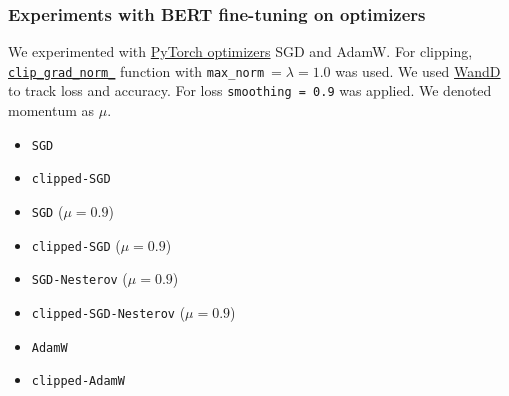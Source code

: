 \begin{frame}
\frametitle{Experiments with BERT fine-tuning on optimizers}
We experimented with \href{https://pytorch.org/docs/stable/optim.html}{\color{blue}PyTorch optimizers} SGD and AdamW. For clipping, \href{https://github.com/pytorch/pytorch/blob/0597eb56c29b3986aa412161b1d3e82b6b36e8d5/torch/nn/utils/clip_grad.py#L12}{\color{blue}\texttt{clip\_grad\_norm\_}} function with \texttt{max\_norm}\(\ =\lambda=1.0\) was used. We used \href{https://wandb.ai/makharev/iu-omml}{\color{blue}WandD} to track loss and accuracy. For loss \texttt{smoothing = 0.9} was applied. We denoted momentum as \(\mu\). 
\begin{itemize}
    \item \texttt{SGD}
    \item \texttt{clipped-SGD}
    \item \texttt{SGD} (\(\mu=0.9\))
    \item \texttt{clipped-SGD} (\(\mu=0.9\))
    \item \texttt{SGD-Nesterov} (\(\mu=0.9\))
    \item \texttt{clipped-SGD-Nesterov} (\(\mu=0.9\))
    \item \texttt{AdamW}
    \item \texttt{clipped-AdamW}
\end{itemize}
\end{frame}
